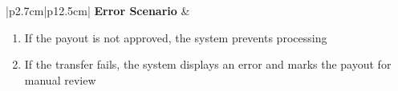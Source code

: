 \begin{table}[H]
\begin{tabular}{|p{2.7cm}|p{12.5cm}|}
        \textbf{Error Scenario} & \begin{minipage}[t]{\linewidth}
                                      \begin{enumerate}[topsep=0pt,itemsep=1pt,parsep=0pt,partopsep=0pt]
                                          \item If the payout is not approved, the system prevents processing
                                          \item If the transfer fails, the system displays an error and marks the payout for
                                                manual review
                                      \end{enumerate}
                                  \end{minipage}    \\
        \hline
    \end{tabular}
    \label{tab:admin-process-payout}
\end{table}
